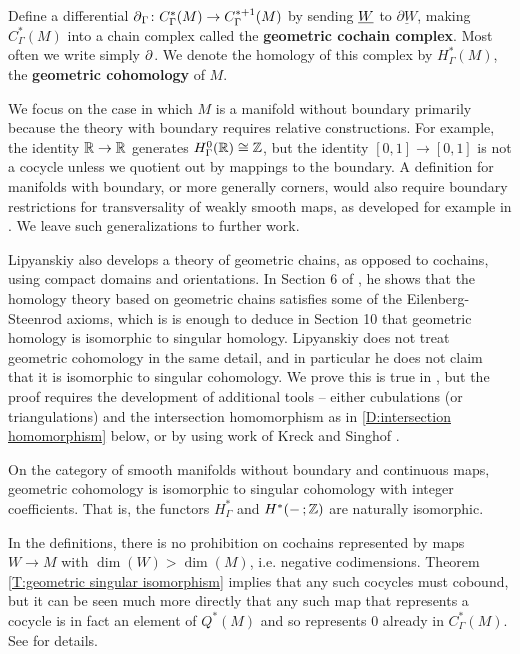 \begin{definition}
	Define a differential $\operatorname{\partial}_\Gamma \colon C_\Gamma^*(M) \to C_\Gamma^{*+1}(M)$ by sending $\underline{W}$ to $ \underline{\partial W}$, making $C_\Gamma^*(M)$ into a chain complex called the {\bf geometric cochain complex}.
	Most often we write simply $\operatorname{\partial}$.
	We denote the homology of this complex by $H^*_\Gamma(M)$, the \textbf{geometric cohomology} of $M$.
\end{definition}

We focus on the case in which $M$ is a manifold without boundary primarily because
the theory with boundary requires relative constructions.
For example, the identity $\mathbb{R}\to\mathbb{R}$ generates $H_\Gamma^0(\mathbb{R})\cong \mathbb{Z}$, but the identity $[0,1] \to [0,1]$ is not a cocycle unless we quotient out by mappings to the boundary.
A definition for manifolds with boundary, or more generally corners, would also require boundary restrictions for transversality of weakly smooth maps, as developed for example in \cite{Joy12}.
We leave such generalizations to further work.

Lipyanskiy also develops a theory of geometric chains, as opposed to cochains, using compact domains and orientations.
In Section 6 of \cite{Lipy14}, he shows that the homology theory based on geometric chains satisfies some of the Eilenberg-Steenrod axioms, which is is enough to deduce in Section 10 that geometric homology is isomorphic to singular homology.
Lipyanskiy does not treat geometric cohomology in the same detail, and in particular he does not claim that it is isomorphic to singular cohomology.
We prove this is true in \cite[Theorem 5.34 and Theorem 6.21]{medina2022foundations}, but the proof requires the development of additional tools -- either cubulations (or triangulations) and the
intersection homomorphism as in \cref{D:intersection homomorphism} below, or by using work of Kreck and Singhof \cite{Krec10, Krec10b}.

\begin{theorem}\label{T:geometric singular isomorphism}
	On the category of smooth manifolds without boundary and continuous maps, geometric cohomology is isomorphic to singular cohomology with integer coefficients.
	That is, the functors $H^*_\Gamma$ and $H^*(- \,;\mathbb{Z})$ are naturally isomorphic.
\end{theorem}

\begin{remark}
	In the definitions, there is no prohibition on cochains represented by maps $W \to M$ with $\dim(W) > \dim(M)$, i.e. negative codimensions.
	Theorem \cref{T:geometric singular isomorphism} implies that any such cocycles must cobound, but it can be seen much more directly that any such map that represents a cocycle is in fact an element of $Q^*(M)$ and so represents $0$ already in $C^*_\Gamma(M)$.
	See \cite[Example 4.23]{medina2022foundations} for details.
\end{remark}

